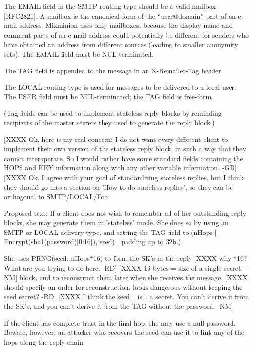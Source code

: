 The EMAIL field in the SMTP routing type should be a valid mailbox
[RFC2821]. A mailbox is the canonical form of the ``user@domain''
part of an e-mail address. Mixminion uses only mailboxes, because the
display name and comment parts of an e-mail address could potentially be
different for senders who have obtained an address from different
sources (leading to smaller anonymity sets). The EMAIL field must be
NUL-terminated.

The TAG field is appended to the message in an X-Remailer-Tag header.

The LOCAL routing type is used for messages to be delivered to a local
user.  The USER field must be NUL-terminated; the TAG field is
free-form.

(Tag fields can be used to implement stateless reply blocks by
reminding recipients of the master secrets they used to generate the
reply block.)

[XXXX Ok, here is my real concern: I do not want every different client
      to implement their own version of the stateless reply block, in
such a way that they cannot interoperate. So I would rather have some 
standard fields containing the HOPS and KEY information along with any
other variable information. -GD]
[XXXX Ok, I agree with your goal of standardizing stateless replies,
      but I think they should go into a section on 'How to do
      stateless replies', so they can be orthogonal to SMTP/LOCAL/Foo  

      Proposed text:
         If a client does not wish to remember all of her outstanding
         reply blocks, she may generate them in 'stateless' mode.  She  
         does so by using an SMTP or LOCAL delivery type, and setting
         the TAG field to 
           (nHops | Encrypt(sha1(password)[0:16]), seed) | padding up to 32b.)

         She uses PRNG(seed, nHops*16) to form the SK's in the reply
[XXXX why *16? What are you trying to do here. -RD]
[XXXX 16 bytes = size of a single secret. -NM]
         block, and to reconstruct them later when she receives the 
         message.
[XXXX should specify an order for reconstruction. looks dangerous
  without keeping the seed secret? -RD]
[XXXX I think the seed =is= a secret.  You can't derive it from the
  SK's, and you can't derive it from the TAG without the password. -NM]
       
         If the client has complete trust in the final hop, she may
         use a null password.  Beware, however: an attacker who recovers 
         the seed can use it to link any of the hops along the reply 
         chain.

